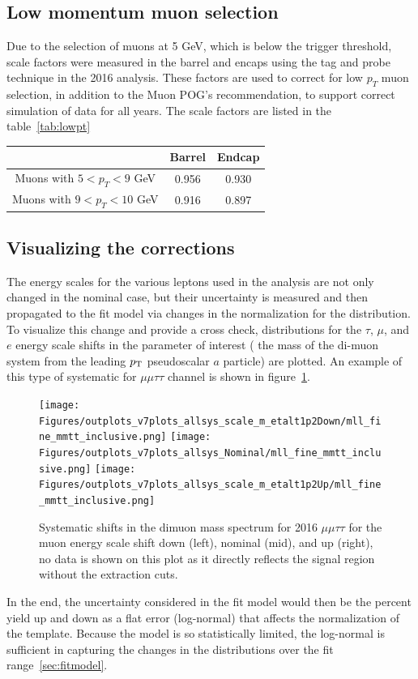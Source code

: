 \subsection{Low momentum muon selection}
Due to the selection of muons at 5 GeV, which is below the trigger threshold, scale factors were measured in the barrel and encaps using the tag and probe technique in the 2016 analysis. These factors are used to correct for low $p_T$ muon selection, in addition to the Muon POG's recommendation, to support correct simulation of data for all years. The scale factors are listed in the table~\ref{tab:lowpt}
\begin{table}[h!tbp]
\centering
{}
\begin{tabular*}{0.6\textwidth}{c|c|c}
   & Barrel & Endcap \\\hline
Muons with $5 < p_T < 9$ GeV & 0.956 & 0.930\\\hline
Muons with $9 < p_T < 10$ GeV & 0.916 & 0.897\\\hline 
\end{tabular*}
\end{table}


\subsection{Visualizing the corrections}

The energy scales for the various leptons used in the analysis are not only changed in the nominal case, but their uncertainty is measured and then propagated to the fit model via changes in the normalization for the distribution. To visualize this change and provide a cross check, distributions for the $\tau$, $\mu$, and $e$ energy scale shifts in the parameter of interest ( the mass of the di-muon system from the leading $p_{\mathrm{T}}$ pseudoscalar $a$ particle) are plotted. 
An example of this type of systematic for $\mu\mu\tau\tau$ channel is shown in figure~\ref{fig:sys_shift_mmtt2016}.
\begin{figure}[ht!b]
\label{fig:sys_shift_mmtt2016}
  \centering
\texttt{[image: Figures/outplots\_v7plots\_allsys\_scale\_m\_etalt1p2Down/mll\_fine\_mmtt\_inclusive.png]} 
\texttt{[image: Figures/outplots\_v7plots\_allsys\_Nominal/mll\_fine\_mmtt\_inclusive.png]}
\texttt{[image: Figures/outplots\_v7plots\_allsys\_scale\_m\_etalt1p2Up/mll\_fine\_mmtt\_inclusive.png]} \\

    \caption{Systematic shifts in the dimuon mass spectrum for 2016 $\mu\mu\tau\tau$ for the muon energy scale shift down (left), nominal (mid), and up (right), no data is shown on this plot as it directly reflects the signal region without the extraction cuts.}
\end{figure}

In the end, the uncertainty considered in the fit model would then be the percent yield up and down as a flat error (log-normal) that affects the normalization of the template. Because the model is so statistically limited, the log-normal is sufficient in capturing the changes in the distributions over the fit range~\ref{sec:fitmodel}.  
